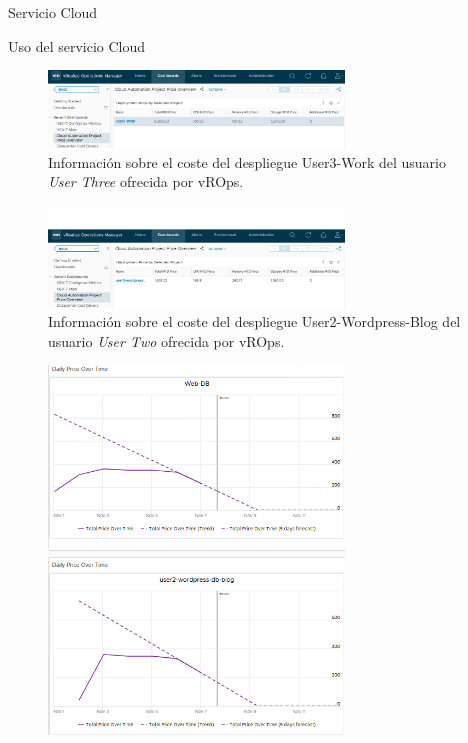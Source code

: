 \begin{subsection}{Servicio Cloud}
\begin{subsubsection}{Uso del servicio Cloud}
\begin{figure}[h]
            \label{fig:vrops-cost-projects}
        \end{figure}
        \FloatBarrier
        \begin{figure}[h]
            \centering
            \includegraphics[width=0.7\textwidth]{imaxes/pruebaconcepto/vrealize/vrops-user3-price.png}
            \caption{Información sobre el coste del despliegue User3-Work del usuario \textit{User Three} ofrecida por vROps.}
            \label{fig:vrops-cost-user3}
        \end{figure}
        \FloatBarrier
        \begin{figure}[h]
            \centering
            \includegraphics[width=0.7\textwidth]{imaxes/pruebaconcepto/vrealize/vrops-user2-price.png}
            \caption{Información sobre el coste del despliegue User2-Wordpress-Blog del usuario \textit{User Two} ofrecida por vROps.}
            \label{fig:vrops-cost-user2}
        \end{figure}
        \FloatBarrier
        \begin{figure}[h]
            \centering
            \includegraphics[width=0.7\textwidth]{imaxes/pruebaconcepto/vrealize/vrops-graf-user2.png}

\end{figure}
\end{subsubsection}
\end{subsection}

